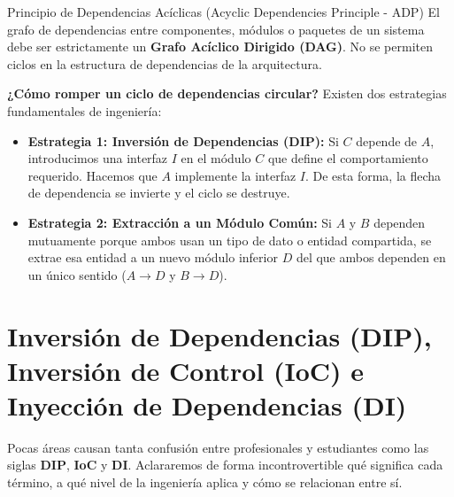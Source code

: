 \begin{definicion}{Principio de Dependencias Acíclicas (Acyclic Dependencies Principle - ADP)}
El grafo de dependencias entre componentes, módulos o paquetes de un sistema debe ser estrictamente un \textbf{Grafo Acíclico Dirigido (DAG)}. No se permiten ciclos en la estructura de dependencias de la arquitectura.
\end{definicion}

\textbf{¿Cómo romper un ciclo de dependencias circular?} Existen dos estrategias fundamentales de ingeniería:
\begin{itemize}[leftmargin=1.5em]
  \item \textbf{Estrategia 1: Inversión de Dependencias (DIP):} Si $C$ depende de $A$, introducimos una interfaz $I$ en el módulo $C$ que define el comportamiento requerido. Hacemos que $A$ implemente la interfaz $I$. De esta forma, la flecha de dependencia se invierte y el ciclo se destruye.
  \item \textbf{Estrategia 2: Extracción a un Módulo Común:} Si $A$ y $B$ dependen mutuamente porque ambos usan un tipo de dato o entidad compartida, se extrae esa entidad a un nuevo módulo inferior $D$ del que ambos dependen en un único sentido ($A \to D$ y $B \to D$).
\end{itemize}

\section{Inversión de Dependencias (DIP), Inversión de Control (IoC) e Inyección de Dependencias (DI)}
\label{sec:dip-ioc-di}

Pocas áreas causan tanta confusión entre profesionales y estudiantes como las siglas \textbf{DIP}, \textbf{IoC} y \textbf{DI}. Aclararemos de forma incontrovertible qué significa cada término, a qué nivel de la ingeniería aplica y cómo se relacionan entre sí.

